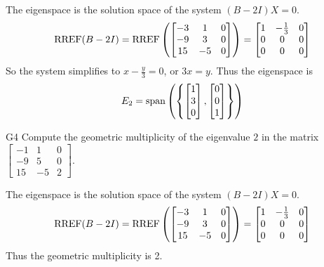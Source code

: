 \documentclass{sbgLAquiz}
\begin{document}
\begin{solution}
The eigenspace is the solution space of the system $(B-2I)X=0$.
$$\operatorname{RREF}(B-2I)=\operatorname{RREF}\left(\begin{bmatrix} -3 & 1 & 0 \\ -9 & 3 & 0 \\ 15 & - 5 & 0 \end{bmatrix} \right) = \begin{bmatrix} 1 & -\frac{1}{3} & 0 \\ 0 & 0 & 0 \\ 0 & 0 & 0 \end{bmatrix}$$
So the system simplifies to $x-\frac{y}{3}=0$, or $3x=y$.  Thus the eigenspace is $$E_2 = {\rm span}\left( \left\{ \begin{bmatrix} 1 \\ 3 \\ 0 \end{bmatrix}, \begin{bmatrix} 0 \\ 0 \\ 1\end{bmatrix} \right\} \right)$$
\end{solution}
\begin{extract}\newpage\end{extract}
\begin{problem}{G4}
Compute the geometric multiplicity of the eigenvalue $2$ in the matrix $\begin{bmatrix} -1 & 1 & 0 \\ -9 & 5 & 0 \\ 15 & -5 & 2 \end{bmatrix}$.
\end{problem}

\begin{solution}
The eigenspace is the solution space of the system $(B-2I)X=0$.
$$\operatorname{RREF}(B-2I)=\operatorname{RREF}\left(\begin{bmatrix} -3 & 1 & 0 \\ -9 & 3 & 0 \\ 15 & - 5 & 0 \end{bmatrix} \right) = \begin{bmatrix} 1 & -\frac{1}{3} & 0 \\ 0 & 0 & 0 \\ 0 & 0 & 0 \end{bmatrix}$$
Thus the geometric multiplicity is 2.
\end{solution}
\end{document}
